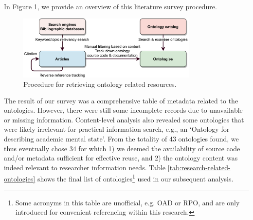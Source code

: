 In Figure \ref{literature-review}, we provide an overview of this literature survey procedure.
\begin{figure}
\centering
\includegraphics[width=9cm]{figures/literature-review.eps}
\caption{
    Procedure for retrieving ontology related resources.} \label{literature-review}
\end{figure}


The result of our survey was a comprehensive table of metadata related to the ontologies. 
However, there were still some incomplete records due to unavailable or missing information.
Content-level analysis also revealed some ontologies that were likely irrelevant for practical information search, e.g., an `Ontology for describing academic mental state'. 
From the totality of 43 ontologies found, we thus eventually chose 34 for which 1) we deemed the availability of source code and/or metadata sufficient for effective reuse, and 2) the ontology content was indeed relevant to researcher information needs.
Table \ref{tab:research-related-ontologies}
shows the final list of ontologies\footnote{Some acronyms in this table are unofficial, e.g. OAD or RPO, and are only introduced for convenient referencing within this research.} used in our subsequent analysis.




% 